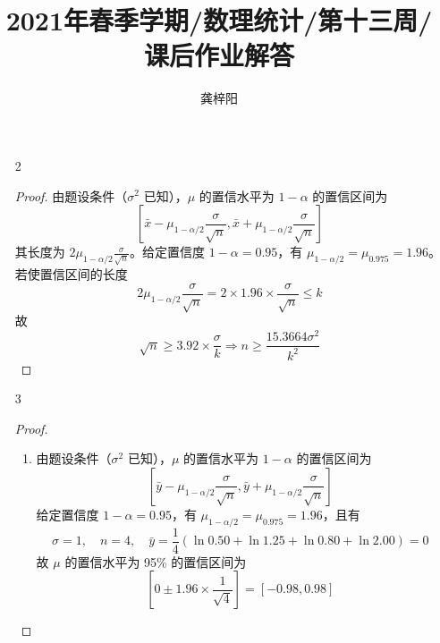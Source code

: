 \documentclass[normal,founder,mtpro2,cn]{elegantnote}
\title{2021年春季学期/数理统计/第十三周/课后作业解答}
\author{龚梓阳}
\date{\zhtoday}
\begin{document}
\maketitle
\begin{enumerate}
    \item[2]
        \begin{proof}
            由题设条件（$\sigma^{2}$ 已知），$\mu$ 的置信水平为 $1-\alpha$ 的置信区间为
            \begin{equation*}
                \left[\bar{x}-\mu_{1-\alpha/2} \frac{\sigma}{\sqrt{n}},\bar{x}+\mu_{1-\alpha/2} \frac{\sigma}{\sqrt{n}}\right]
            \end{equation*}
            其长度为 $2\mu_{1-\alpha/2}\frac{\sigma}{\sqrt{n}}$。给定置信度 $1-\alpha=0.95$，有 $\mu_{1-\alpha/2}=\mu_{0.975}=1.96$。若使置信区间的长度
            \begin{equation*}
                2\mu_{1-\alpha/2}\frac{\sigma}{\sqrt{n}}=2\times 1.96 \times\frac{\sigma}{\sqrt{n}}\leq k
            \end{equation*}
            故
            \begin{equation*}
                \sqrt{n}\geq 3.92\times\frac{\sigma}{k} \Rightarrow n\geq\frac{15.3664\sigma^{2}}{k^{2}}
            \end{equation*}
        \end{proof}
    \item[3]
        \begin{proof}
            \begin{enumerate}
                \item 由题设条件（$\sigma^{2}$ 已知），$\mu$ 的置信水平为 $1-\alpha$ 的置信区间为
                      \begin{equation*}
                          \left[\bar{y}-\mu_{1-\alpha/2}\frac{\sigma}{\sqrt{n}},\bar{y}+\mu_{1-\alpha/2}\frac{\sigma}{\sqrt{n}}\right]
                      \end{equation*}
                      给定置信度 $1-\alpha=0.95$，有 $\mu_{1-\alpha/2}=\mu_{0.975}=1.96$，且有
                      \begin{equation*}
                          \sigma=1,\quad n=4,\quad \bar{y}=\frac{1}{4}(\ln 0.50+\ln 1.25+\ln 0.80+\ln 2.00)=0
                      \end{equation*}
                      故 $\mu$ 的置信水平为 95\% 的置信区间为
                      \begin{equation*}
                          \left[0 \pm 1.96 \times\frac{1}{\sqrt{4}}\right]=\left[-0.98,0.98\right]

\end{equation*}
\end{enumerate}
\end{proof}
\end{enumerate}
\end{document}
